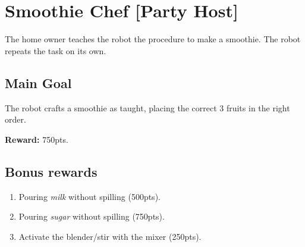 \section{Smoothie Chef [Party Host]}
\label{test:smoothie-chef}
The home owner teaches the robot the procedure to make a smoothie.
The robot repeats the task on its own.



\subsection*{Main Goal}
The robot crafts a smoothie as taught, placing the correct 3 fruits in the right order.

\noindent\textbf{Reward:} 750pts.


\subsection*{Bonus rewards}
\begin{enumerate}[nosep]
	\item Pouring \emph{milk} without spilling (500pts).
	\item Pouring \emph{sugar} without spilling (750pts).
	\item Activate the blender/stir with the mixer (250pts).
\end{enumerate}

